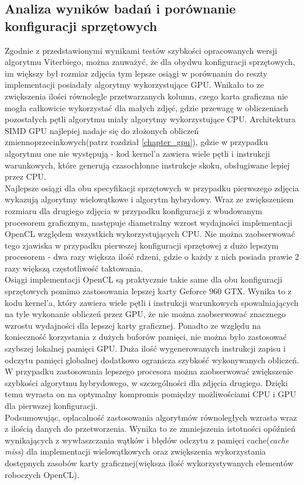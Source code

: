 \documentclass[document.tex]{subfiles}
\begin{document}
\subsection{Analiza wyników badań i porównanie konfiguracji sprzętowych}
\indent Zgodnie z przedstawionymi wynikami testów szybkości opracowanych wersji algorytmu Viterbiego, 
można zauważyć, że dla obydwu konfiguracji sprzętowych, im większy był rozmiar zdjęcia tym lepsze
osiągi w porównaniu do reszty implementacji posiadały algorytmy wykorzystujące GPU.
Wnikało to ze zwiększenia ilości równolegle przetwarzanych kolumn, czego karta graficzna nie mogła
całkowicie wykorzystać dla małych zdjęć, gdzie przewagę w obliczeniach pozostałych pętli algorytmu
miały algorytmy wykorzystujące CPU. Architektura SIMD GPU najlepiej nadaje się do złożonych 
obliczeń zmiennoprzecinkowych(patrz rozdział \ref{chapter_gpu}), gdzie w przypadku algorytmu
one nie występują - kod kernel'a zawiera wiele pętli i instrukcji warunkowych, które 
generują czasochłonne instrukcje skoku, obsługiwane lepiej przez CPU. 
\\
\indent Najlepsze osiągi dla obu specyfikacji sprzętowych w przypadku pierwszego zdjęcia 
wykazują algorytmy wielowątkowe i algorytm hybrydowy. Wraz ze zwiększeniem rozmiaru dla drugiego zdjęcia
w przypadku konfiguracji z wbudowanym procesorem graficznym, następuje diametralny wzrost wydajności 
implementacji OpenCL względem wszystkich wykorzystujących CPU. Nie można zaobserwować tego zjawiska
w przypadku pierwszej konfiguracji sprzętowej z dużo lepszym procesorem - dwa razy większa ilość rdzeni, gdzie
o każdy z nich posiada prawie 2 razy większą częstotliwość taktowania. 
\\
\indent Osiągi implementacji OpenCL są praktycznie takie same dla obu konfiguracji sprzętowych 
pomimo zastosowania lepszej karty Geforce 960 GTX.
Wynika to z kodu kernel'a, który zawiera wiele pętli i instrukcji warunkowych spowalniających na tyle
wykonanie obliczeń przez GPU, że nie można zaobserwować znacznego wzrostu wydajności dla lepszej karty graficznej.
Ponadto ze względu na konieczność korzystania z dużych buforów pamięci, nie można było zastosować 
szybszej lokalnej pamięci GPU. Duża ilość wygenerowanych instrukcji zapisu i odczytu pamięci globalnej 
dodatkowo ogranicza szybkość wykonywanych obliczeń.
\\
\indent W przypadku zastosowania lepszego procesora można zaobserwować zwiększenie
szybkości algorytmu hybrydowego, w szczególności dla zdjęcia drugiego. Dzięki temu
wyrasta on na optymalny kompromis pomiędzy możliwościami CPU i GPU dla pierwszej konfiguracji.
\\
\indent Podsumowując, opłacalność zastosowania algorytmów równoległych wzrasta wraz z ilością
danych do przetworzenia. Wynika to ze zmniejszenia istotności opóźnień wynikających z wywłaszczania wątków i
błędów odczytu z pamięci cache(\textit{cache miss}) dla implementacji wielowątkowych oraz
zwiększenia wykorzystania dostępnych zasobów karty graficznej(większa ilość wykorzystywanych elementów roboczych OpenCL).
\end{document}
